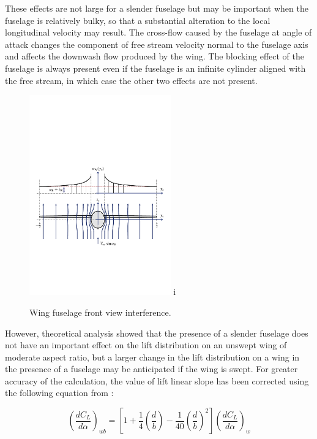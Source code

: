 These effects are not large for a slender fuselage but may be important when the fuselage is relatively bulky, so that a substantial alteration to the local longitudinal velocity may result. The cross-flow caused by the fuselage at angle of attack changes the component of free stream velocity normal to the fuselage axis and affects the downwash flow produced by the wing. The blocking effect of the fuselage is always present even if the fuselage is an infinite cylinder aligned with the free stream, in which case the other two effects are not present. \cite{sforza2014commercial}

\begin{figure}[H]
\centering
{\includegraphics[height=8.63cm]{Immagini/wing_fuselage_front_view_interference.pdf}} 
i\label{wf2}
\caption{Wing fuselage front view interference.}
\end{figure} 		




However, theoretical analysis showed that the presence of a slender fuselage does not have an important effect on the lift
distribution on an unswept wing of moderate aspect ratio, but a larger change in the lift distribution on a wing in the presence of a fuselage may be anticipated if the wing is swept.\cite{zlotnick}
For greater accuracy of the calculation, the value of lift linear slope has been corrected using the following equation from \cite{roskammethods}:

\begin{equation}
\left ( \frac{d C_L}{d\alpha} \right)_{w \!b} = \left[ 1 + \frac{1}{4} \left ( \frac {d}{b} \right ) - \frac{1}{40} \left (\frac{d}{b} \right) ^2 \right] \left ( \frac{d C_L}{d\alpha} \right)_{w}
\end{equation}

